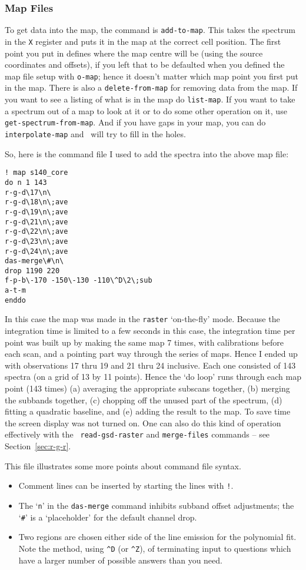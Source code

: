 \subsubsection{Map Files}
\label{sec:specx_13.2}
To get data into the map, the command is {\tt add-to-map}.  This takes
the spectrum in the {\tt X} register and puts it in the map at the
correct cell position.  The first point you put in defines where the
map centre will be (using the source coordinates and offsets), if you 
left that to be defaulted when you defined the map file setup with
{\tt o-map}; hence it doesn't matter which map point you first put in 
the map. There is also a {\tt delete-from-map}
for removing data from the map.  If you want to see a listing of what is
in the map do {\tt list-map}. If you want to take a spectrum out of a
map to look at it or to do some other operation on it, use {\tt
get-spectrum-from-map}.  And if you have gaps in your map, you can do
{\tt interpolate-map} and \SPECX\ will try to fill in the holes.

So, here is the command file I used to add the spectra into the above
map file:

\begin{verbatim}
! map s140_core
do n 1 143
r-g-d\17\n\
r-g-d\18\n\;ave
r-g-d\19\n\;ave
r-g-d\21\n\;ave
r-g-d\22\n\;ave
r-g-d\23\n\;ave
r-g-d\24\n\;ave
das-merge\#\n\
drop 1190 220
f-p-b\-170 -150\-130 -110\^D\2\;sub
a-t-m
enddo
\end{verbatim}

In this case the map was made in the {\tt raster} `on-the-fly'
mode. Because the integration time is limited to a few seconds in this
case, the integration time per point was built up by making the same
map 7 times, with calibrations before each scan, and a pointing part
way through the series of maps. Hence I ended up with observations 17
thru 19 and 21 thru 24 inclusive. Each one consisted of 143 spectra
(on a grid of 13 by 11 points). Hence the `do loop' runs through each
map point (143 times) (a) averaging the appropriate subscans together,
(b) merging the subbands together, (c) chopping off the unused part of
the spectrum, (d) fitting a quadratic baseline, and (e) adding the
result to the map. To save time the screen display was not turned
on. One can also do this kind of operation effectively with the {\tt
read-gsd-raster} and {\tt merge-files} commands -- see
Section~\ref{sec:r-g-r}.

This file illustrates some more points about command file syntax.
\begin{itemize}
\item
Comment lines can be inserted by starting the lines with {\tt !}.
\item
The `{\tt{n}}' in the {\tt das-merge} command inhibits subband offset 
adjustments; the `\verb|#|' is a `placeholder' for the default channel
drop.
\item
Two regions are chosen either side of the line emission for the
polynomial fit.  Note the method, using \verb|^D| (or \verb|^Z|), of 
terminating
input to questions which have a larger number of possible answers
than you need.
\end{itemize}

